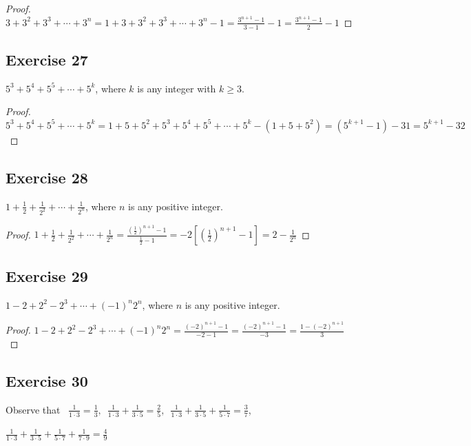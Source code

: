 \documentclass[14pt]{extarticle}
\newcommand{\dps}{\displaystyle}
\begin{document}
\begin{proof}
$\dps 3 + 3^2 + 3^3 + \cdots + 3^n = 1 + 3 + 3^2 + 3^3 + \cdots + 3^n - 1 = \frac{3^{n+1}-1}{3-1} - 1 = \frac{3^{n+1}-1}{2} - 1$
\end{proof}

\subsection{Exercise 27}
$5^3 + 5^4 + 5^5 + \cdots + 5^k$, where $k$ is any integer with $k \geq 3$.

\begin{proof}
$5^3 + 5^4 + 5^5 + \cdots + 5^k = 1 + 5 + 5^2 + 5^3 + 5^4 + 5^5 + \cdots + 5^k - (1 + 5 + 5^2) = (5^{k+1} - 1) - 31 = 5^{k+1} - 32$
\end{proof}

\subsection{Exercise 28}
$\dps 1 + \frac{1}{2} + \frac{1}{2^2} + \cdots + \frac{1}{2^n}$, where $n$ is any positive integer.

\begin{proof}
$\dps 1 + \frac{1}{2} + \frac{1}{2^2} + \cdots + \frac{1}{2^n} = \frac{\left(\frac{1}{2}\right)^{n+1} - 1}{\frac{1}{2} - 1} = -2\left[\left(\frac{1}{2}\right)^{n+1} - 1\right] = 2 - \frac{1}{2^n}$
\end{proof}

\subsection{Exercise 29}
$1 - 2 + 2^2 - 2^3 + \cdots + (-1)^n 2^n$, where $n$ is any positive integer.

\begin{proof}
$\dps 1 - 2 + 2^2 - 2^3 + \cdots + (-1)^n 2^n = \frac{(-2)^{n+1} - 1}{-2 - 1} = \frac{(-2)^{n+1} - 1}{-3} = \frac{1 - (-2)^{n+1}}{3}$
\end{proof}

\subsection{Exercise 30}
Observe that $\,\,\,\dps \frac{1}{1 \cdot 3} = \dps \frac{1}{3}, \,\,\, \frac{1}{1 \cdot 3} + \frac{1}{3 \cdot 5} = \dps \frac{2}{5}, \,\,\, \frac{1}{1 \cdot 3} + \frac{1}{3 \cdot 5} + \frac{1}{5 \cdot 7} = \dps \frac{3}{7}$, 

$\dps \frac{1}{1 \cdot 3} + \frac{1}{3 \cdot 5} + \frac{1}{5 \cdot 7} + \frac{1}{7 \cdot 9} = \dps \frac{4}{9}$
\end{document}
